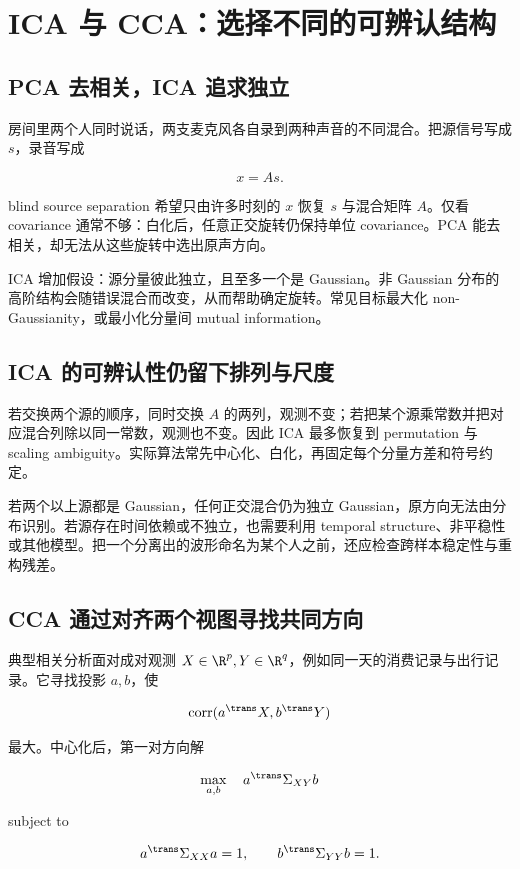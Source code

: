 \section{ICA 与 CCA：选择不同的可辨认结构}

\subsection{PCA 去相关，ICA 追求独立}

房间里两个人同时说话，两支麦克风各自录到两种声音的不同混合。把源信号写成 \(s\)，录音写成

\[
x=As.
\]

blind source separation 希望只由许多时刻的 \(x\) 恢复 \(s\) 与混合矩阵 \(A\)。仅看 covariance 通常不够：白化后，任意正交旋转仍保持单位 covariance。PCA 能去相关，却无法从这些旋转中选出原声方向。

ICA 增加假设：源分量彼此独立，且至多一个是 Gaussian。非 Gaussian 分布的高阶结构会随错误混合而改变，从而帮助确定旋转。常见目标最大化 non-Gaussianity，或最小化分量间 mutual information。

\subsection{ICA 的可辨认性仍留下排列与尺度}

若交换两个源的顺序，同时交换 \(A\) 的两列，观测不变；若把某个源乘常数并把对应混合列除以同一常数，观测也不变。因此 ICA 最多恢复到 permutation 与 scaling ambiguity。实际算法常先中心化、白化，再固定每个分量方差和符号约定。

若两个以上源都是 Gaussian，任何正交混合仍为独立 Gaussian，原方向无法由分布识别。若源存在时间依赖或不独立，也需要利用 temporal structure、非平稳性或其他模型。把一个分离出的波形命名为某个人之前，还应检查跨样本稳定性与重构残差。

\subsection{CCA 通过对齐两个视图寻找共同方向}

典型相关分析面对成对观测 \(X\in\R^p,Y\in\R^q\)，例如同一天的消费记录与出行记录。它寻找投影 \(a,b\)，使

\[
\operatorname{corr}(a^\trans X,b^\trans Y)
\]

最大。中心化后，第一对方向解

\[
\max_{a,b}\quad a^\trans\Sigma_{XY}b
\]

subject to

\[
a^\trans\Sigma_{XX}a=1,
\qquad
b^\trans\Sigma_{YY}b=1.
\]

